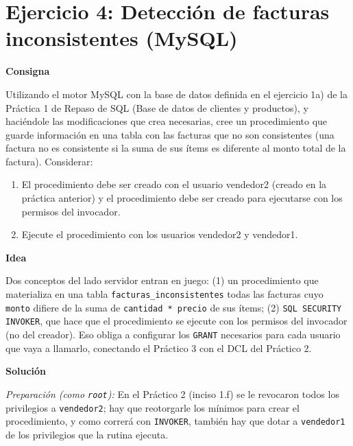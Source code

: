 \documentclass[11pt,a4paper]{article}
\newcommand{\itemcabecera}[1]{\noindent\textbf{#1}\par\medskip}
\newcommand{\bloqueConsigna}{\itemcabecera{Consigna}}
\newcommand{\bloqueIdea}{\itemcabecera{Idea}}
\newcommand{\bloqueSolucion}{\itemcabecera{Soluci\'on}}
\begin{document}
\section{Ejercicio 4: Detección de facturas inconsistentes (MySQL)}

\bloqueConsigna

Utilizando el motor MySQL con la base de datos definida en el ejercicio 1a) de la Práctica 1 de Repaso de SQL (Base de datos de clientes y productos), y haciéndole las modificaciones que crea necesarias, cree un procedimiento que guarde información en una tabla con las facturas que no son consistentes (una factura no es consistente si la suma de sus ítems es diferente al monto total de la factura). Considerar:

\begin{enumerate}[label=\alph*),leftmargin=*]
    \item El procedimiento debe ser creado con el usuario vendedor2 (creado en la práctica anterior) y el procedimiento debe ser creado para ejecutarse con los permisos del invocador.
    \item Ejecute el procedimiento con los usuarios vendedor2 y vendedor1.
\end{enumerate}

\bloqueIdea

Dos conceptos del lado servidor entran en juego: (1) un procedimiento que materializa en una tabla \texttt{facturas\_inconsistentes} todas las facturas cuyo \texttt{monto} difiere de la suma de \texttt{cantidad * precio} de sus ítems; (2) \texttt{SQL SECURITY INVOKER}, que hace que el procedimiento se ejecute con los permisos del invocador (no del creador). Eso obliga a configurar los \texttt{GRANT} necesarios para cada usuario que vaya a llamarlo, conectando el Práctico 3 con el DCL del Práctico 2.

\bloqueSolucion

\textit{Preparación (como \texttt{root}):} En el Práctico 2 (inciso 1.f) se le revocaron todos los privilegios a \texttt{vendedor2}; hay que reotorgarle los mínimos para crear el procedimiento, y como correrá con \texttt{INVOKER}, también hay que dotar a \texttt{vendedor1} de los privilegios que la rutina ejecuta.
\end{document}
